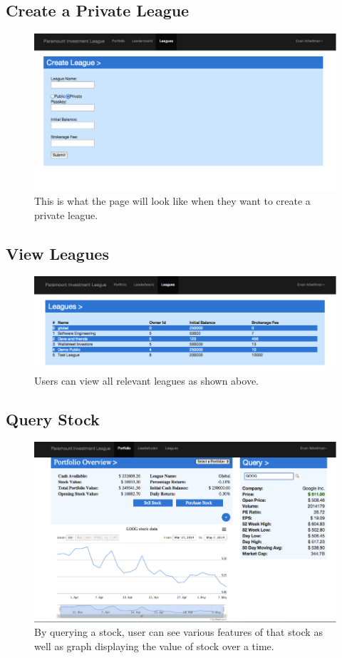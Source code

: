 \subsection{Create a Private League}
\begin{figure}[H]
\centering
\includegraphics[width=5.5in]{./img/ui/7.png}
\caption{This is what the page will look like when they want to create a private league.}
\end{figure}

\subsection{View Leagues}
\begin{figure}[H]
\centering
\includegraphics[width=5.5in]{./img/ui/8.png}
\caption{Users can view all relevant leagues as shown above.}
\end{figure}

\subsection{Query Stock}
\begin{figure}[H]
\centering
\includegraphics[width=5.5in]{./img/ui/9.png}
\caption{By querying a stock, user can see various features of that stock as well as graph displaying the value of stock over a time.}
\end{figure}


